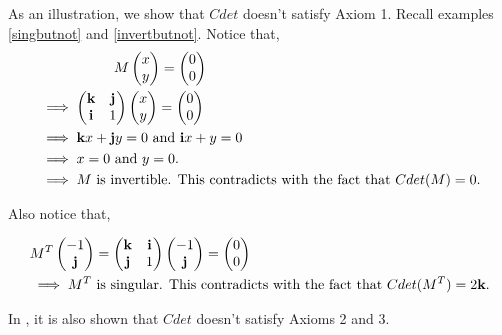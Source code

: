 \begin{ex}
\cite{aslaksen} As an illustration, we show that $Cdet$ doesn't satisfy Axiom 1. Recall examples \ref{singbutnot} and \ref{invertbutnot}. Notice that,
\begin{align*}
	&\text{\indent\indent\indent}M\begin{pmatrix}
	x \\
	y
	\end{pmatrix} = 
	\begin{pmatrix}
	0 \\
	0
	\end{pmatrix} \\ &\implies
	\begin{pmatrix}
	 		\kb & \jb \\
	 		\ib & 1
	\end{pmatrix}
	\begin{pmatrix}
	x \\
	y
	\end{pmatrix} = 
	\begin{pmatrix}
	0 \\
	0
	\end{pmatrix} \\ &\implies
	\kb x + \jb y = 0 \text{ and } \ib x + y = 0 \\ &\implies
	x = 0 \text{ and } y = 0. \\ &\implies
	M \text{ is invertible. This contradicts with the fact that $Cdet(M) = 0$.}
\end{align*}

Also notice that,

\begin{align*}
	&M^T\begin{pmatrix}
	-1 \\
	\textbf{j}
	\end{pmatrix} = 
	\begin{pmatrix}
	 		\textbf{k} & \textbf{i} \\
	 		\textbf{j} & 1
	\end{pmatrix}
	\begin{pmatrix}
	-1 \\
	\textbf{j}
	\end{pmatrix} = 
	\begin{pmatrix}
	0 \\
	0
	\end{pmatrix} \\ &\implies
	M^T \text{ is singular. This contradicts with the fact that $Cdet(M^T) = 2\textbf{k}$.}
\end{align*}
\end{ex}
 In \cite{aslaksen}, it is also shown that $Cdet$ doesn't satisfy Axioms 2 and 3.


